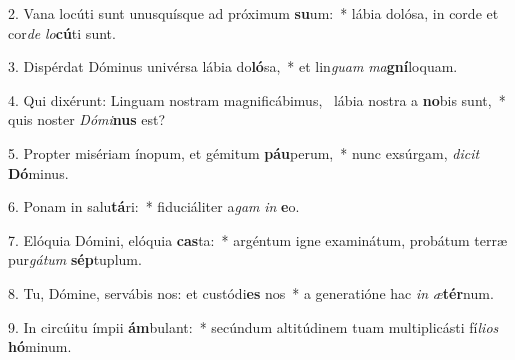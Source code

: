2. Vana locúti sunt unusquísque ad próximum \textbf{su}um:~*  lábia dolósa, in corde et cor\textit{de} \textit{lo}\textbf{cú}ti sunt.\

3. Dispérdat Dóminus univérsa lábia do\textbf{ló}sa,~*  et lin\textit{guam} \textit{ma}\textbf{gní}loquam.\

4. Qui dixérunt: Linguam nostram magnificábimus, \dag\  lábia nostra a \textbf{no}bis sunt,~*  quis noster \textit{Dó}\textit{mi}\textbf{nus} est?\

5. Propter misériam ínopum, et gémitum \textbf{páu}perum,~*  nunc exsúrgam, \textit{di}\textit{cit} \textbf{Dó}minus.\

6. Ponam in salu\textbf{tá}ri:~*  fiduciáliter a\textit{gam} \textit{in} \textbf{e}o.\

7. Elóquia Dómini, elóquia \textbf{cas}ta:~*  argéntum igne examinátum, probátum terræ pur\textit{gá}\textit{tum} \textbf{sép}tuplum.\

8. Tu, Dómine, servábis nos: et custódi\textbf{es} nos~*  a generatióne hac \textit{in} \textit{æ}\textbf{tér}num.\

9. In circúitu ímpii \textbf{ám}bulant:~*  secúndum altitúdinem tuam multiplicásti fí\textit{li}\textit{os} \textbf{hó}minum.\

